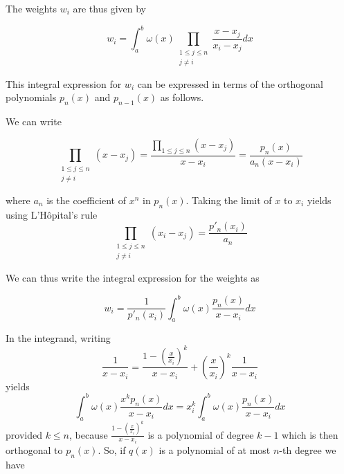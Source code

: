 \documentclass[conference,onecolumn,12pt]{IEEEtran}
\theoremstyle{definition}
\begin{document}
The weights $w_i$ are thus given by

\begin{equation}
    \label{eqnote2}
w_{i} = \int_{a}^{b}\omega(x)\prod_{\begin{smallmatrix}1\leq j\leq n\\j\neq i\end{smallmatrix}}\frac{x-x_{j}}{x_{i}-x_{j}}dx
\end{equation}

This integral expression for $w_{i}$ can be expressed in terms of the orthogonal polynomials $p_{n}(x)$ and $p_{n-1}(x)$ as follows.

We can write

\begin{equation}
\prod_{\begin{smallmatrix}1\leq j\leq n\\j\neq i\end{smallmatrix}}\left(x-x_{j}\right) = \frac{\prod_{1\leq j\leq n} \left(x - x_{j}\right)}{x-x_{i}} = \frac{p_{n}(x)}{a_{n}\left(x-x_{i}\right)}
\end{equation}

where $a_{n}$ is the coefficient of $x^n$ in $p_{n}(x)$. Taking the limit of $x$ to $x_{i}$ yields using L'Hôpital's rule
\begin{equation}
\prod_{\begin{smallmatrix}1\leq j\leq n\\j\neq i\end{smallmatrix}}\left(x_{i}-x_{j}\right) = \frac{p'_{n}(x_{i})}{a_{n}}    
\end{equation}


 We can thus write the integral expression for the weights as

 \begin{equation}
     w_{i} = \frac{1}{p'_{n}(x_{i})}\int_{a}^{b}\omega(x)\frac{p_{n}(x)}{x-x_{i}}dx
 \end{equation}

 In the integrand, writing
 \begin{equation}
     \frac{1}{x-x_i} = \frac{1 - \left(\frac{x}{x_i}\right)^{k}}{x - x_i} + \left(\frac{x}{x_i}\right)^{k} \frac{1}{x - x_i}
 \end{equation}
 yields
 \begin{equation}
     \int_a^b\omega(x)\frac{x^kp_n(x)}{x-x_i}dx= x_i^k\int_{a}^{b}\omega(x)\frac{p_n(x)}{x-x_i}dx
 \end{equation}
 provided $k \leq n$, because $\frac{1-\left(\frac{x}{x_{i}}\right)^{k}}{x-x_{i}}$ is a polynomial of degree $k-1$ which is then orthogonal to $p_{n}(x)$. So, if $q(x)$ is a polynomial of at most $n$-th degree we have
\end{document}
